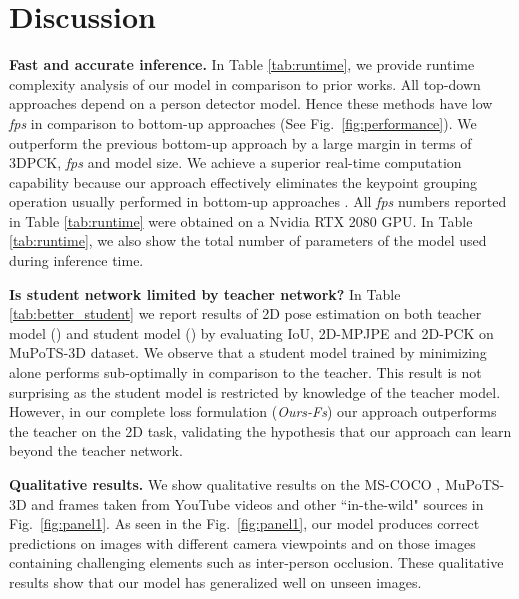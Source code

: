 \documentclass[runningheads]{llncs}
\begin{document}
\vspace{-2mm}
\section{Discussion}
\label{sec:discussion}

\noindent \textbf{Fast and accurate inference.} In Table \ref{tab:runtime}, we provide runtime complexity analysis of our model in comparison to prior works. All top-down approaches \cite{moon2019camera,rogez2017lcr,rogez2019lcr} depend on a person detector model. Hence these methods have low \textit{fps} in comparison to bottom-up approaches (See Fig.~\ref{fig:performance}). We outperform the previous bottom-up approach by a large margin in terms of 3DPCK, \textit{fps} and model size. We achieve a superior real-time computation capability because our approach effectively eliminates the keypoint grouping operation usually performed in bottom-up approaches \cite{cao2017realtime,mehta2018single}. All \textit{fps} numbers reported in Table \ref{tab:runtime} were obtained on a Nvidia RTX 2080 GPU. In Table \ref{tab:runtime}, we also show the total number of parameters of the model used during inference time.

\textbf{Is student network limited by teacher network?} In  Table \ref{tab:better_student} we report results of 2D pose estimation on both teacher model () and student model () by evaluating IoU, 2D-MPJPE and 2D-PCK on MuPoTS-3D dataset. We observe that a student model trained by minimizing  alone performs sub-optimally in comparison to the teacher. This result is not surprising as the student model is restricted by knowledge of the teacher model. However, in our complete loss formulation (\textit{Ours-Fs}) our approach outperforms the teacher on the 2D task, validating the hypothesis that our approach can learn beyond the teacher network.

\textbf{Qualitative results.} We show qualitative results on the MS-COCO \cite{lin2014microsoft}, MuPoTS-3D and frames taken from YouTube videos and other ``in-the-wild" sources in Fig.~\ref{fig:panel1}. As seen in the Fig.~\ref{fig:panel1}, our model produces correct predictions on images with different camera viewpoints and on those images containing challenging elements such as inter-person occlusion. These qualitative results show that our model has generalized well on unseen images.  
\end{document}
